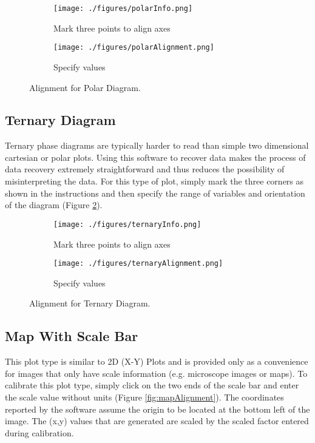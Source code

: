 \documentclass[letterpaper, 10pt]{article}
\begin{document}
\begin{figure}
\centering
{\begin{subfigure}[b]{0.4\textwidth}
\texttt{[image: ./figures/polarInfo.png]}
\caption{Mark three points to align axes}
\end{subfigure}
\begin{subfigure}[b]{0.3\textwidth}
\texttt{[image: ./figures/polarAlignment.png]}
\caption{Specify values}
\end{subfigure}}
\caption{Alignment for Polar Diagram.}
\label{fig:polarAlignment}
\end{figure}
 
\subsection{Ternary Diagram}
Ternary phase diagrams are typically harder to read than simple two dimensional cartesian or polar plots. Using this software to recover data makes the process of data recovery extremely straightforward and thus reduces the possibility of misinterpreting the data. For this type of plot, simply mark the three corners as shown in the instructions and then specify the range of variables and orientation of the diagram (Figure \ref{fig:ternaryAlignment}).

\begin{figure}
\centering
{\begin{subfigure}[b]{0.4\textwidth}
\texttt{[image: ./figures/ternaryInfo.png]}
\caption{Mark three points to align axes}
\end{subfigure}
\begin{subfigure}[b]{0.4\textwidth}
\texttt{[image: ./figures/ternaryAlignment.png]}
\caption{Specify values}
\end{subfigure}}
\caption{Alignment for Ternary Diagram.}
\label{fig:ternaryAlignment}
\end{figure}

\subsection{Map With Scale Bar}
This plot type is similar to 2D (X-Y) Plots and is provided only as a convenience for images that only have scale information (e.g. microscope images or maps). To calibrate this plot type, simply click on the two ends of the scale bar and enter the scale value without units (Figure \ref{fig:mapAlignment}). The coordinates reported by the software assume the origin to be located at the bottom left of the image. The (x,y) values that are generated are scaled by the scaled factor entered during calibration.
\end{document}
